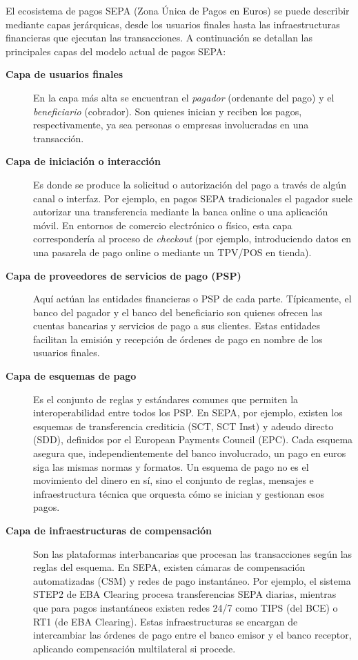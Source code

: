 El ecosistema de pagos SEPA (Zona Única de Pagos en Euros) se puede describir mediante capas jerárquicas, desde los usuarios finales hasta las infraestructuras financieras que ejecutan las transacciones. A continuación se detallan las principales capas del modelo actual de pagos SEPA:

\begin{description}
  \item[\textbf{Capa de usuarios finales}] 
    En la capa más alta se encuentran el \emph{pagador} (ordenante del pago) y el \emph{beneficiario} (cobrador). Son quienes inician y reciben los pagos, respectivamente, ya sea personas o empresas involucradas en una transacción.

  \item[\textbf{Capa de iniciación o interacción}] 
    Es donde se produce la solicitud o autorización del pago a través de algún canal o interfaz. Por ejemplo, en pagos SEPA tradicionales el pagador suele autorizar una transferencia mediante la banca online o una aplicación móvil. En entornos de comercio electrónico o físico, esta capa correspondería al proceso de \emph{checkout} (por ejemplo, introduciendo datos en una pasarela de pago online o mediante un TPV/POS en tienda).

  \item[\textbf{Capa de proveedores de servicios de pago (PSP)}] 
    Aquí actúan las entidades financieras o PSP de cada parte. Típicamente, el banco del pagador y el banco del beneficiario son quienes ofrecen las cuentas bancarias y servicios de pago a sus clientes. Estas entidades facilitan la emisión y recepción de órdenes de pago en nombre de los usuarios finales.

  \item[\textbf{Capa de esquemas de pago}] 
    Es el conjunto de reglas y estándares comunes que permiten la interoperabilidad entre todos los PSP. En SEPA, por ejemplo, existen los esquemas de transferencia crediticia (SCT, SCT Inst) y adeudo directo (SDD), definidos por el European Payments Council (EPC). Cada esquema asegura que, independientemente del banco involucrado, un pago en euros siga las mismas normas y formatos. Un esquema de pago no es el movimiento del dinero en sí, sino el conjunto de reglas, mensajes e infraestructura técnica que orquesta cómo se inician y gestionan esos pagos.

  \item[\textbf{Capa de infraestructuras de compensación}] 
    Son las plataformas interbancarias que procesan las transacciones según las reglas del esquema. En SEPA, existen cámaras de compensación automatizadas (CSM) y redes de pago instantáneo. Por ejemplo, el sistema STEP2 de EBA Clearing procesa transferencias SEPA diarias, mientras que para pagos instantáneos existen redes 24/7 como TIPS (del BCE) o RT1 (de EBA Clearing). Estas infraestructuras se encargan de intercambiar las órdenes de pago entre el banco emisor y el banco receptor, aplicando compensación multilateral si procede.


\end{description}
